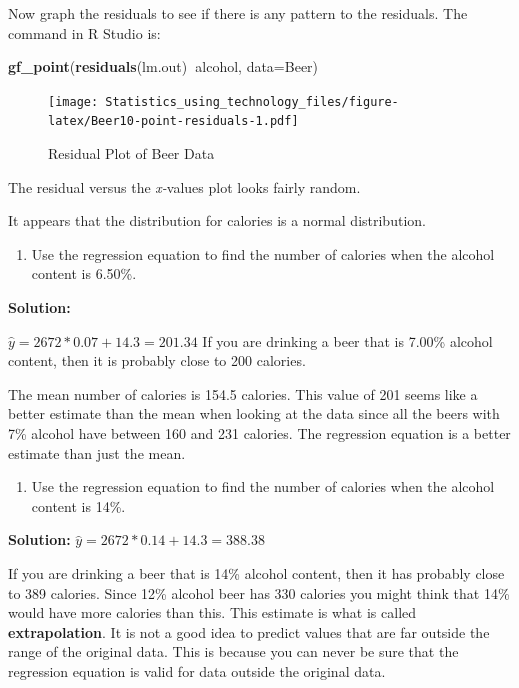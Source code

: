 \documentclass[]{book}
\newenvironment{Shaded}{\begin{snugshade}}{\end{snugshade}}
\newcommand{\DataTypeTok}[1]{\textcolor[rgb]{0.13,0.29,0.53}{#1}}
\newcommand{\KeywordTok}[1]{\textcolor[rgb]{0.13,0.29,0.53}{\textbf{#1}}}
\newcommand{\NormalTok}[1]{#1}
\newcommand{\OperatorTok}[1]{\textcolor[rgb]{0.81,0.36,0.00}{\textbf{#1}}}
\providecommand{\tightlist}{%
  \setlength{\itemsep}{0pt}\setlength{\parskip}{0pt}}
\begin{document}
Now graph the residuals to see if there is any pattern to the residuals. The command in R Studio is:



\begin{Shaded}
\begin{Highlighting}[]
\KeywordTok{gf_point}\NormalTok{(}\KeywordTok{residuals}\NormalTok{(lm.out)}\OperatorTok{~}\NormalTok{alcohol, }\DataTypeTok{data=}\NormalTok{Beer)}
\end{Highlighting}
\end{Shaded}

\begin{figure}
\centering
\texttt{[image: Statistics\_using\_technology\_files/figure-latex/Beer10-point-residuals-1.pdf]}
\caption{\label{fig:Beer10-point-residuals}Residual Plot of Beer Data}
\end{figure}

The residual versus the \emph{x-}values plot looks fairly random.

It appears that the distribution for calories is a normal distribution.

\begin{enumerate}
\def\labelenumi{\alph{enumi}.}
\setcounter{enumi}{1}
\tightlist
\item
  Use the regression equation to find the number of calories when the alcohol content is 6.50\%.
\end{enumerate}

\textbf{Solution:}

\(\hat{y}=2672*0.07+14.3=201.34\) If you are drinking a beer that is 7.00\% alcohol content, then it is probably close to 200 calories.

The mean number of calories is 154.5 calories. This value of 201 seems like a better estimate than the mean when looking at the data since all the beers with 7\% alcohol have between 160 and 231 calories. The regression equation is a better estimate than just the mean.

\begin{enumerate}
\def\labelenumi{\alph{enumi}.}
\setcounter{enumi}{2}
\tightlist
\item
  Use the regression equation to find the number of calories when the alcohol content is 14\%.
\end{enumerate}

\textbf{Solution:}
\(\hat{y}=2672*0.14+14.3=388.38\)

If you are drinking a beer that is 14\% alcohol content, then it has probably close to 389 calories. Since 12\% alcohol beer has 330 calories you might think that 14\% would have more calories than this. This estimate is what is called \textbf{extrapolation}. It is not a good idea to predict values that are far outside the range of the original data. This is because you can never be sure that the regression equation is valid for data outside the original data.
\end{document}

